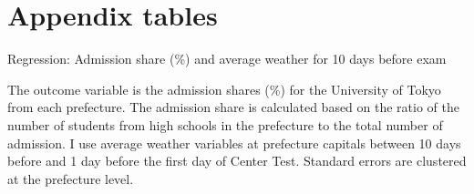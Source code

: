 \documentclass[12pt,letterpaper]{article}
\begin{document}
%

\setcounter{figure}{0}
\setcounter{table}{0}
\renewcommand\thefigure{\Alph{section}.\arabic{figure}}
\renewcommand\thetable{\Alph{section}.\arabic{table}}
  
\section{Appendix tables}

\begin{table}[H]
  \center
  \caption{Regression: Admission share (\%) and average weather for 10 days before exam}
  
  \label{tab:reg_pre10}
  \small
  \begin{tablenotes}
    \item
      The outcome variable is the admission shares (\%) for the University of Tokyo from each prefecture.
      The admission share is calculated based on the ratio of the number of students from high schools in the prefecture to the total number of admission.
      I use average weather variables at prefecture capitals between 10 days before and 1 day before the first day of Center Test.
      Standard errors are clustered at the prefecture level.
  \end{tablenotes}
\end{table}

  
\end{document}
